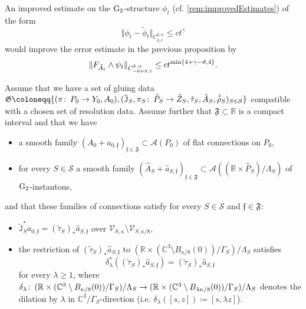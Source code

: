 \documentclass[11pt,a4paper]{scrartcl}
\newcommand{\col}{\colon \thinspace}
\newcommand{\VertWHt}[3]{\Vert_{C^{{#1},\alpha}_{{#2},t}{#3}}}
\newcommand{\G}{\textup{G}}
\numberwithin{equation}{section}
\theoremstyle{plain}
\theoremstyle{definition}
\theoremstyle{remark}
\begin{document}
\begin{remark}
An improved estimate on the $\G_2$-structure $\phi_t$ (cf. \autoref{rem:improvedEstimates}) of the form \[ \Vert \phi_t - \tilde{\phi}_t \VertWHt{k}{0}{} \leq c t^\gamma \] would improve the error estimate in the previous proposition by \[ \Vert F_{\tilde{A}_t} \wedge \psi_t \VertWHt{k}{-6+\vartheta}{} \leq c t^{\textup{min}\{4+\gamma-\vartheta,4\}}. \]  
\end{remark}

\begin{proposition}\label{prop:pregluing-family}
Assume that we have a set of gluing data $\mathfrak{G}\coloneqq \{(\pi \col P_0\to Y_0,A_0), (\tilde{\mathtt{J}}_S,\pi_S \col \hat{P}_S \to \hat{Z}_S, \tilde{\tau}_S, \hat{A}_S, \hat{\tilde{\rho}}_S)_{S\in \mathcal{S}}\} $ compatible with a chosen set of resolution data. Assume further that $\mathfrak{F}\subset \mathbb{R}$ is a compact interval and that we have
\begin{itemize}
\item a smooth family $(A_0 + a_{0,\mathfrak{f}})_{\mathfrak{f} \in \mathfrak{F}} \subset \mathcal{A}(P_0)$ of flat connections on $P_0$,
\item for every $S\in \mathcal{S}$ a smooth family $(\hat{A}_S + \hat{a}_{S,\mathfrak{f}})_{\mathfrak{f} \in \mathfrak{F}} \subset \mathcal{A}((\mathbb{R}\times \hat{P}_S)/\Lambda_S)$ of $\G_2$-instantons,
\end{itemize}
and that these families of connections satisfy for every $S\in \mathcal{S}$ and $\mathfrak{f}\in \mathfrak{F}$:
\begin{itemize}
\item $\tilde{\mathtt{J}}_S^*a_{0,\mathfrak{f}} = (\tilde{\tau}_S)_*\hat{a}_{S,\mathfrak{f}}$ over $\mathcal{V}_{S,\kappa}\setminus \mathcal{V}_{S,\kappa/8}$,
\item the restriction of $(\tilde{\tau}_S)_*\hat{a}_{S,\mathfrak{f}}$ to $(\mathbb{R}\times (\mathbb{C}^3 \setminus B_{\kappa/8}(0))/\Gamma_S)/\Lambda_S$ satisfies \[\delta_{\lambda}^*((\tilde{\tau}_S)_*\hat{a}_{S,\mathfrak{f}}) = (\tilde{\tau}_S)_*\hat{a}_{S,\mathfrak{f}} \] for every $\lambda\geq 1$, where $\delta_\lambda \col (\mathbb{R}\times (\mathbb{C}^3 \setminus B_{\kappa/8}(0))/\Gamma_S)/\Lambda_S \to (\mathbb{R}\times (\mathbb{C}^3 \setminus B_{\lambda\kappa/8}(0))/\Gamma_S)/\Lambda_S$ denotes the dilation by $\lambda$ in $\mathbb{C}^3/\Gamma_S$-direction (i.e. $\delta_\lambda([s,z]) \coloneqq [s,\lambda z]$). 
\end{itemize}

\end{proposition}
\end{document}
